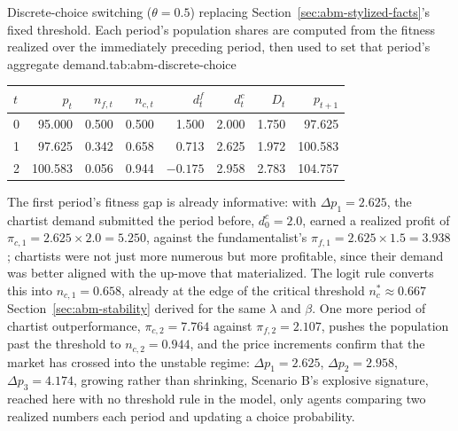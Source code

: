 \documentclass[../ai_in_finance]{subfiles}
\begin{document}
\begin{booktable}{Discrete-choice switching ($\theta=0.5$) replacing Section~\ref{sec:abm-stylized-facts}'s fixed threshold. Each period's population shares are computed from the fitness realized over the immediately preceding period, then used to set that period's aggregate demand.}{tab:abm-discrete-choice}
\begin{tabular}{lrrrrrrr}
\toprule
$t$ & $p_t$ & $n_{f,t}$ & $n_{c,t}$ & $d^f_t$ & $d^c_t$ & $D_t$ & $p_{t+1}$ \\
\midrule
0 & 95.000  & 0.500 & 0.500 & 1.500    & 2.000 & 1.750 & 97.625 \\
1 & 97.625  & 0.342 & 0.658 & 0.713    & 2.625 & 1.972 & 100.583 \\
2 & 100.583 & 0.056 & 0.944 & $-0.175$ & 2.958 & 2.783 & 104.757 \\
\bottomrule
\end{tabular}
\end{booktable}

The first period's fitness gap is already informative: with $\Delta p_1=2.625$, the chartist demand submitted the period before, $d^c_0=2.0$, earned a realized profit of $\pi_{c,1}=2.625\times2.0=5.250$, against the fundamentalist's $\pi_{f,1}=2.625\times1.5=3.938$; chartists were not just more numerous but more profitable, since their demand was better aligned with the up-move that materialized. The logit rule converts this into $n_{c,1}=0.658$, already at the edge of the critical threshold $n_c^{*}\approx0.667$ Section~\ref{sec:abm-stability} derived for the same $\lambda$ and $\beta$. One more period of chartist outperformance, $\pi_{c,2}=7.764$ against $\pi_{f,2}=2.107$, pushes the population past the threshold to $n_{c,2}=0.944$, and the price increments confirm that the market has crossed into the unstable regime: $\Delta p_1=2.625$, $\Delta p_2=2.958$, $\Delta p_3=4.174$, growing rather than shrinking, Scenario B's explosive signature, reached here with no threshold rule in the model, only agents comparing two realized numbers each period and updating a choice probability.
\end{document}
